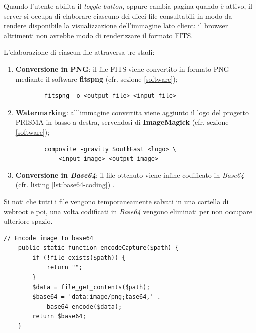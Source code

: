 Quando l'utente abilita il \emph{toggle button}, oppure cambia pagina quando è attivo, il server si occupa di elaborare ciascuno dei dieci file consultabili in modo da rendere disponibile la visualizzazione dell'immagine lato client: il browser altrimenti non avrebbe modo di renderizzare il formato FITS.

L'elaborazione di ciascun file attraversa tre stadi:

\begin{enumerate}
    \item \textbf{Conversione in PNG}: il file FITS viene convertito in formato PNG mediante il software \textbf{fitspng} (cfr. sezione \ref{software});
    \begin{verbatim}
        fitspng -o <output_file> <input_file>
    \end{verbatim}
    \item \textbf{Watermarking}: all'immagine convertita viene aggiunto il logo del progetto PRISMA in basso a destra, servendosi di \textbf{ImageMagick} (cfr. sezione \ref{software});
    \begin{verbatim}
        composite -gravity SouthEast <logo> \ 
            <input_image> <output_image>
    \end{verbatim}
    \item \textbf{Conversione in \emph{Base64}}: il file ottenuto viene infine codificato in \emph{Base64} (cfr. listing \ref{lst:base64-coding}) .
\end{enumerate}

Si noti che tutti i file vengono temporaneamente salvati in una cartella di webroot e poi, una volta codificati in \emph{Base64} vengono eliminati per non occupare ulteriore spazio.

\begin{lstlisting}[style=PHP,caption={Metodo PHP per codificare i file in \emph{Base64}.},captionpos=b,label={lst:base64-coding}]
    // Encode image to base64
    public static function encodeCapture($path) {
        if (!file_exists($path)) {
            return "";
        }
        $data = file_get_contents($path);
        $base64 = 'data:image/png;base64,' . 
            base64_encode($data);
        return $base64;
    }
\end{lstlisting}

